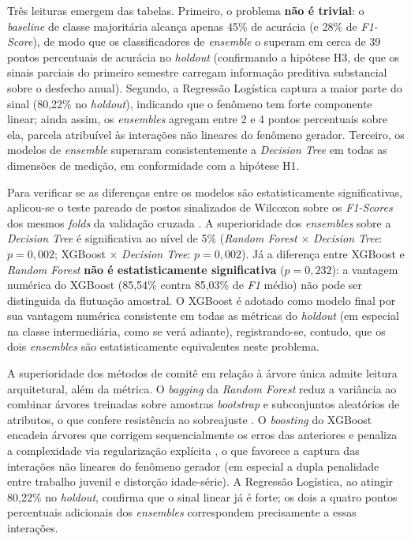 Três leituras emergem das tabelas. Primeiro, o problema \textbf{não é trivial}: o \textit{baseline} de classe majoritária alcança apenas 45\% de acurácia (e 28\% de \textit{F1-Score}), de modo que os classificadores de \textit{ensemble} o superam em cerca de 39 pontos percentuais de acurácia no \textit{holdout} (confirmando a hipótese H3, de que os sinais parciais do primeiro semestre carregam informação preditiva substancial sobre o desfecho anual). Segundo, a Regressão Logística captura a maior parte do sinal (80,22\% no \textit{holdout}), indicando que o fenômeno tem forte componente linear; ainda assim, os \textit{ensembles} agregam entre 2 e 4 pontos percentuais sobre ela, parcela atribuível às interações não lineares do fenômeno gerador. Terceiro, os modelos de \textit{ensemble} superaram consistentemente a \textit{Decision Tree} em todas as dimensões de medição, em conformidade com a hipótese H1.

Para verificar se as diferenças entre os modelos são estatisticamente significativas, aplicou-se o teste pareado de postos sinalizados de Wilcoxon sobre os \textit{F1-Scores} dos mesmos \textit{folds} da validação cruzada \cite{demsar2006}. A superioridade dos \textit{ensembles} sobre a \textit{Decision Tree} é significativa ao nível de 5\% (\textit{Random Forest} $\times$ \textit{Decision Tree}: $p = 0{,}002$; XGBoost $\times$ \textit{Decision Tree}: $p = 0{,}002$). Já a diferença entre XGBoost e \textit{Random Forest} \textbf{não é estatisticamente significativa} ($p = 0{,}232$): a vantagem numérica do XGBoost (85,54\% contra 85,03\% de \textit{F1} médio) não pode ser distinguida da flutuação amostral. O XGBoost é adotado como modelo final por sua vantagem numérica consistente em todas as métricas do \textit{holdout} (em especial na classe intermediária, como se verá adiante), registrando-se, contudo, que os dois \textit{ensembles} são estatisticamente equivalentes neste problema.

A superioridade dos métodos de comitê em relação à árvore única admite leitura arquitetural, além da métrica. O \textit{bagging} da \textit{Random Forest} reduz a variância ao combinar árvores treinadas sobre amostras \textit{bootstrap} e subconjuntos aleatórios de atributos, o que confere resistência ao sobreajuste \cite{denisko2018}. O \textit{boosting} do XGBoost encadeia árvores que corrigem sequencialmente os erros das anteriores e penaliza a complexidade via regularização explícita \cite{chen2016}, o que favorece a captura das interações não lineares do fenômeno gerador (em especial a dupla penalidade entre trabalho juvenil e distorção idade-série). A Regressão Logística, ao atingir 80,22\% no \textit{holdout}, confirma que o sinal linear já é forte; os dois a quatro pontos percentuais adicionais dos \textit{ensembles} correspondem precisamente a essas interações.

